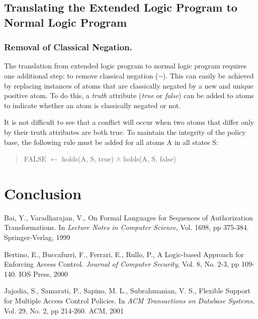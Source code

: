 \documentclass{llncs}
\begin{document}
    \subsection{Translating the Extended Logic Program to Normal Logic Program}

      \subsubsection{Removal of Classical Negation.}

        The translation from extended logic program to normal logic program
        requires one additional step: to remove classical negation ($\lnot$).
        This can easily be achieved by replacing instances of atoms that are
        classically negated by a new and unique positive atom. To do this,
        a \emph{truth} attribute (\emph{true} or \emph{false}) can be added to
        atoms to indicate whether an atom is classically negated or not.

        It is not difficult to see that a conflict will occur when two atoms
        that differ only by their truth attributes are both true. To maintain
        the integrity of the policy base, the following rule must be added 
        for all atoms A in all states S:

        \begin{quote}
          FALSE $\leftarrow$ holds(A, S, true) $\land$ holds(A, S, false)
        \end{quote}

  \section{Conclusion}


  \begin{thebibliography}{5}
      Bai, Y., Varadharajan, V.,
      On Formal Languages for Sequences of Authorization Transformations.
      In \emph{Lecture Notes in Computer Science},
      Vol. 1698,
      pp 375-384.
      Springer-Verlag, 1999

      Bertino, E., Buccafurri, F., Ferrari, E., Rullo, P.,
      A Logic-based Approach for Enforcing Access Control.
      \emph{Journal of Computer Security},
      Vol. 8, No. 2-3,
      pp 109-140.
      IOS Press, 2000

      Jajodia, S., Samarati, P., Sapino, M. L., Subrahmanian, V. S.,
      Flexible Support for Multiple Access Control Policies.
      In \emph{ACM Transactions on Database Systems},
      Vol. 29, No. 2,
      pp 214-260.
      ACM, 2001
  \end{thebibliography}
\end{document}
